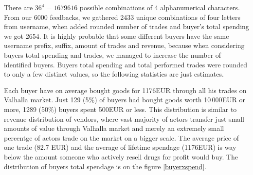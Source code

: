 \documentclass[
  digital, %
  table,   %
  lof,     %
  lot,     %
  oneside
]{fithesis3}
\begin{document}
There are $36^4=1679616$ possible combinations of 4 alphanumerical characters.
From our 6000 feedbacks, we gathered 2433 unique combinations of four letters from username,
when added rounded number of trades and buyer's total spending we got 2654.
It is highly probable that some different buyers have the same username prefix, suffix, amount of 
trades and revenue, because when considering buyers total spending and trades, we managed to increase
the number of identified buyers. Buyers total spending and total performed trades were rounded to only a few distinct values, so the
following statistics are just estimates.

Each buyer have on average bought goods for 1176EUR through all his trades on Valhalla market.
Just 129 (5\%) of buyers had bought goods worth 10\,000EUR or more,
 1289 (50\%) buyers spent 500EUR or less.
This distribution is similar to revenue distribution of vendors, where
vast majority of actors transfer just small amounts of value through Valhalla market and
merely an extremely small percentge of actors trade on the market on a bigger scale.
The average price of one trade (82.7 EUR) and the average of lifetime spendage (1176EUR)
is way below the amount someone who actively resell drugs for profit would buy.
The distribution of buyers total spendage is on the figure \ref{buyerxspend}.
\end{document}
